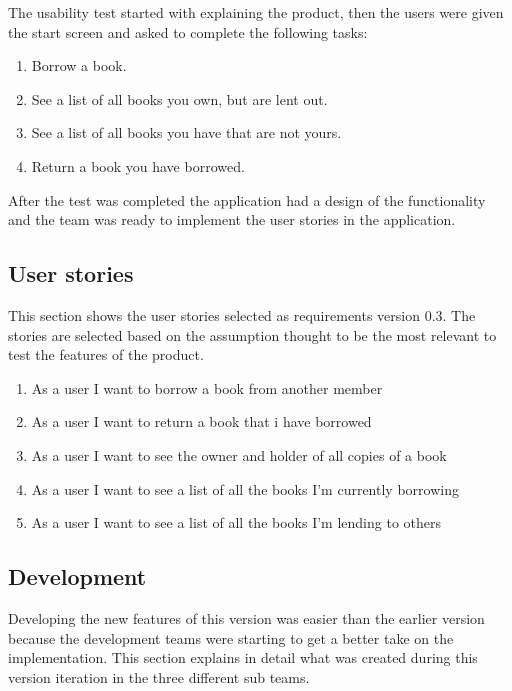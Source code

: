 The usability test started with explaining the product, then the users were given the start screen and asked to complete the following tasks:
\begin{enumerate}
\item Borrow a book.
\item See a list of all books you own, but are lent out.
\item See a list of all books you have that are not yours.
\item Return a book you have borrowed.
\end{enumerate}

After the test was completed the application had a design of the functionality and the team was ready to implement the user stories in the application.




\subsection{User stories}
\label{user-stories-v3}
This section shows the user stories selected as requirements version 0.3. The stories are selected based on the assumption thought to be the most relevant to test the features of the product. 

\begin{enumerate}
  \item As a user I want to borrow a book from another member  
  \item As a user I want to return a book that i have borrowed
  \item As a user I want to see the owner and holder of all copies of a book
  \item As a user I want to see a list of all the books I'm currently borrowing
  \item As a user I want to see a list of all the books I'm lending to others
\end{enumerate}



\subsection{Development}
Developing the new features of this version was easier than the earlier version because the development teams were starting to get a better take on the implementation. This section explains in detail what was created during this version iteration in the three different sub teams.

